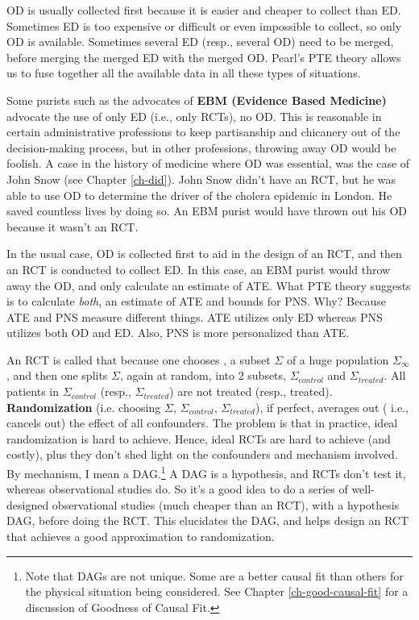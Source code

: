OD is usually collected first
because it is easier and cheaper to collect
than ED. Sometimes ED is too expensive or difficult
or even impossible to collect,
so only OD is available.
Sometimes several ED (resp., several OD)
need to be merged, before merging
the merged ED with the merged OD. Pearl's PTE theory
allows us to fuse together all the
available data
in all these types of
situations.

Some purists such as the advocates of {\bf EBM (Evidence Based Medicine)}
advocate the use of only ED (i.e., only RCTs), no OD. This is reasonable in
certain administrative  professions to keep partisanship and chicanery out of
the decision-making process, but in other professions, throwing away OD would
be foolish.  A case in the history of medicine where OD was
essential, was the case of John Snow (see Chapter \ref{ch-did}). John Snow
didn't have an RCT, but he was able to use OD to determine the driver of the
cholera epidemic in London. He saved countless lives by doing so. An EBM
purist would have thrown out his OD because it wasn't an RCT.

In the usual case, OD is collected first to aid in the design of an RCT, and
then an RCT is conducted to collect ED. In this case, an EBM purist would
throw away the OD, and only calculate an estimate of ATE.
What PTE theory
suggests is to calculate {\it both}, an estimate of ATE and bounds for PNS.
Why? Because ATE and PNS measure different things. ATE utilizes only ED
whereas PNS utilizes both OD and ED. Also, PNS is more personalized than ATE.


An RCT is called that 
because one chooses
, a subset $\Sigma$
of a huge population
$\Sigma_\infty$,
and then one 
splits $\Sigma$,
again at random, into 2
subsets, $\Sigma_{control}$ and $\Sigma_{treated}$.
All patients in 
$\Sigma_{control}$ (resp., 
$\Sigma_{treated}$) are not treated
(resp., treated).
{\bf Randomization}
(i.e. choosing $\Sigma$,
$\Sigma_{control}$, $\Sigma_{treated}$), if perfect, averages out (
i.e., cancels out) 
the effect of all confounders. The problem is that in practice, ideal randomization is hard to achieve. Hence, ideal RCTs are hard to achieve (and costly), plus they don't shed light on the confounders and mechanism involved.
By  mechanism, I mean a DAG.\footnote{Note
that DAGs are not unique. Some are a better causal fit than others
for the 
physical
situation
being considered. See Chapter \ref{ch-good-causal-fit}
for a discussion of Goodness of Causal Fit.}
 A DAG is a hypothesis, and RCTs don't test it, whereas observational studies do.
So it's a good
idea to do a series of well-designed observational studies (much cheaper than an RCT), with a hypothesis DAG, before doing the RCT. This
elucidates the DAG, 
and helps design an RCT that achieves a good approximation to randomization.

